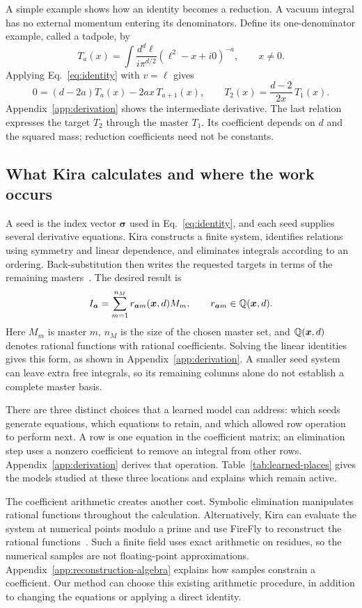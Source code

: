 A simple example shows how an identity becomes a reduction. A vacuum integral has no external momentum entering its denominators. Define its one-denominator example, called a tadpole, by
\begin{equation}
 T_a(x)=\int\frac{d^d\ell}{i\pi^{d/2}}(\ell^2-x+i0)^{-a},
 \qquad x\ne0.
 \label{eq:intro-tadpole}
\end{equation}
Applying Eq.~\eqref{eq:identity} with $v=\ell$ gives
\begin{equation}
 0=(d-2a)T_a(x)-2ax\,T_{a+1}(x),
 \qquad
 T_2(x)=\frac{d-2}{2x}\,T_1(x).
 \label{eq:intro-recurrence}
\end{equation}
Appendix~\ref{app:derivation} shows the intermediate derivative. The last relation expresses the target $T_2$ through the master $T_1$. Its coefficient depends on $d$ and the squared mass; reduction coefficients need not be constants.

\subsection{What Kira calculates and where the work occurs}
A seed is the index vector $\boldsymbol\sigma$ used in Eq.~\eqref{eq:identity}, and each seed supplies several derivative equations. Kira constructs a finite system, identifies relations using symmetry and linear dependence, and eliminates integrals according to an ordering. Back-substitution then writes the requested targets in terms of the remaining masters~\cite{KiraOriginal,Laporta}. The desired result is
\begin{equation}
 I_{\boldsymbol a}=\sum_{m=1}^{n_M}
 r_{\boldsymbol a m}(\boldsymbol x,d)M_m,
 \qquad r_{\boldsymbol a m}\in\mathbb Q(\boldsymbol x,d).
 \label{eq:reduction}
\end{equation}
Here $M_m$ is master $m$, $n_M$ is the size of the chosen master set, and $\mathbb Q(\boldsymbol x,d)$ denotes rational functions with rational coefficients. Solving the linear identities gives this form, as shown in Appendix~\ref{app:derivation}. A smaller seed system can leave extra free integrals, so its remaining columns alone do not establish a complete master basis.

There are three distinct choices that a learned model can address: which seeds generate equations, which equations to retain, and which allowed row operation to perform next. A row is one equation in the coefficient matrix; an elimination step uses a nonzero coefficient to remove an integral from other rows. Appendix~\ref{app:derivation} derives that operation. Table~\ref{tab:learned-places} gives the models studied at these three locations and explains which remain active.

The coefficient arithmetic creates another cost. Symbolic elimination manipulates rational functions throughout the calculation. Alternatively, Kira can evaluate the system at numerical points modulo a prime and use FireFly to reconstruct the rational functions~\cite{Kira2,FireFly2019,FireFly2020}. Such a finite field uses exact arithmetic on residues, so the numerical samples are not floating-point approximations. Appendix~\ref{app:reconstruction-algebra} explains how samples constrain a coefficient. Our method can choose this existing arithmetic procedure, in addition to changing the equations or applying a direct identity.
